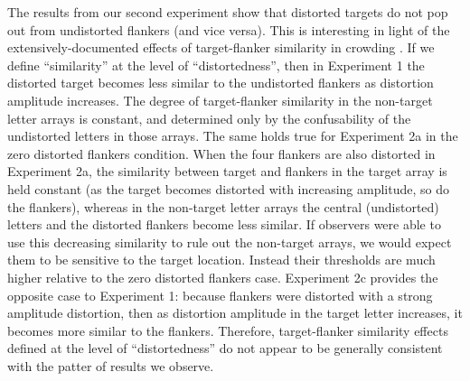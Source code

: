 \documentclass[doc, 11pt,a4paper,natbib]{apa6}\usepackage[]{graphicx}\usepackage[]{color}
\begin{document}
The results from our second experiment show that distorted targets do not pop out from undistorted flankers (and vice versa).
This is interesting in light of the extensively-documented effects of target-flanker similarity in crowding
\citep{estes_similarity-related_1982, wilkinson_lateral_1997, kooi_effect_1994, bernard_dependence_2011, chung_spatialfrequency_2001, chakravarthi_same_2011, glen_orientationcrowding_2013, livne_configuration_2007, livne_how_2010, herzog_crowding_2015, manassi_when_2013, saarela_global_2009, sayim_grouping_2013}.
If we define ``similarity'' at the level of ``distortedness'', then in Experiment 1 the distorted target becomes less similar to the undistorted flankers as distortion amplitude increases.
The degree of target-flanker similarity in the non-target letter arrays is constant, and determined only by the confusability of the undistorted letters in those arrays.
The same holds true for Experiment 2a in the zero distorted flankers condition.
When the four flankers are also distorted in Experiment 2a, the similarity between target and flankers in the target array is held constant (as the target becomes distorted with increasing amplitude, so do the flankers), whereas in the non-target letter arrays the central (undistorted) letters and the distorted flankers become less similar.
If observers were able to use this decreasing similarity to rule out the non-target arrays, we would expect them to be sensitive to the target location.
Instead their thresholds are much higher relative to the zero distorted flankers case.
Experiment 2c provides the opposite case to Experiment 1: because flankers were distorted with a strong amplitude distortion, then as distortion amplitude in the target letter increases, it becomes more similar to the flankers.
Therefore, target-flanker similarity effects defined at the level of ``distortedness'' do not appear to be generally consistent with the patter of results we observe.
\end{document}
